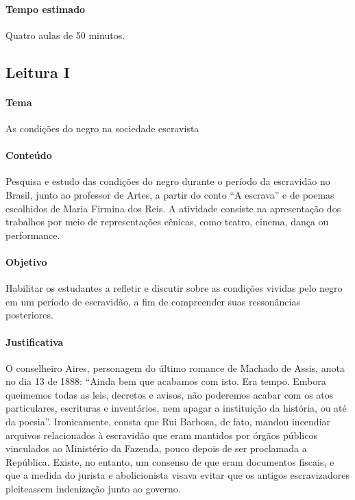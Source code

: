 \documentclass[12pt]{extarticle}
\begin{document}
\paragraph{Tempo estimado} Quatro aulas de 50 minutos.

\subsection{Leitura I}

\paragraph{Tema} As condições do negro na sociedade escravista
  
\paragraph{Conteúdo} Pesquisa e estudo das condições do negro durante o
período da escravidão no Brasil, junto 
ao professor de Artes, a partir do conto ``A escrava'' e de
poemas escolhidos de Maria Firmina dos Reis. A atividade consiste na
apresentação dos trabalhos por meio de representações cênicas, como
teatro, cinema, dança ou performance.

\paragraph{Objetivo} Habilitar os estudantes a refletir e discutir sobre
as condições vividas pelo negro em um período de escravidão, a fim de
compreender suas ressonâncias posteriores.


\paragraph{Justificativa} O conselheiro Aires, personagem do último
romance de Machado de Assis, anota no dia 13 de 1888: ``Ainda bem que
acabamos com isto. Era tempo. Embora queimemos todas as leis, decretos e
avisos, não poderemos acabar com os atos particulares, escrituras e
inventários, nem apagar a instituição da história, ou até da poesia''.
Ironicamente, consta que Rui Barbosa, de fato, mandou incendiar arquivos
relacionados à escravidão que eram mantidos por órgãos públicos
vinculados ao Ministério da Fazenda, pouco depois de ser proclamada a
República. Existe, no entanto, um consenso de que eram documentos
fiscais, e que a medida do jurista e abolicionista visava evitar que os
antigos escravizadores pleiteassem indenização junto ao governo.
\end{document}
